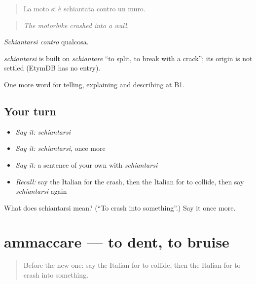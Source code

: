 \begin{quote}
La moto si è schiantata contro un muro.
\end{quote}

\begin{quote}
\emph{The motorbike crashed into a wall.}
\end{quote}

\emph{Schiantarsi contro} qualcosa.

\begin{cousinweb}
\emph{schiantarsi} is built on \emph{schiantare} \textquotedblleft{}to split, to break with a crack\textquotedblright{}; its origin is not settled (EtymDB has no entry).
\end{cousinweb}

\begin{grammarlens}[title={What you've built}]
One more word for telling, explaining and describing at B1.
\end{grammarlens}

\subsection*{Your turn}
\begin{itemize}
\raggedright
  \item \emph{Say it:} \emph{schiantarsi}
  \item \emph{Say it:} \emph{schiantarsi}, once more
  \item \emph{Say it:} a sentence of your own with \emph{schiantarsi}
  \item \emph{Recall:} say the Italian for the crash, then the Italian for to collide, then say \emph{schiantarsi} again
\end{itemize}

\begin{tcolorbox}[breakable,colback=teal!4,colframe=teal!35!black,title={Before you move on}]
What does schiantarsi mean? (\textquotedblleft{}To crash into something\textquotedblright{}.) Say it once more.
\end{tcolorbox}
\section[ammaccare]{ammaccare — to dent, to bruise}

\label{lesson:IT-C299-ammaccare}



\begin{quote}
Before the new one: say the Italian for to collide, then the Italian for to crash into something.
\end{quote}

